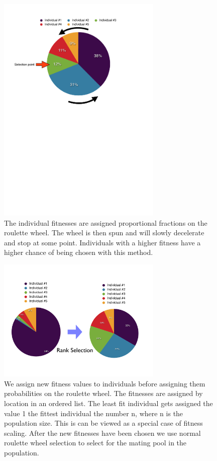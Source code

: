 \begin{figure}[htbp] %
   \centering
   \includegraphics[width=0.7\textwidth]{chapter_ga/plots/rws_cropped.pdf} 
   \caption{The individual fitnesses are assigned proportional fractions on the roulette wheel. The wheel is then spun and will slowly decelerate and stop at some point. Individuals with a higher fitness have a higher chance of being chosen with this method.}
   \label{fig:roulettewheel}
\end{figure}

\begin{figure}[htbp] %
   \centering
   \includegraphics[width=0.7\textwidth]{chapter_ga/plots/rank_select.pdf} 
   \caption{We assign new fitness values to individuals before assigning them probabilities on the roulette wheel. The fitnesses are assigned by location in an ordered list. The least fit individual gets assigned the value 1 the fittest individual the number n, where n is the population size. This is can be viewed as a special case of fitness scaling. After the new fitnesses have been chosen we use normal roulette wheel selection to select for the mating pool in the population. }
   \label{fig:rankselection}
\end{figure}

